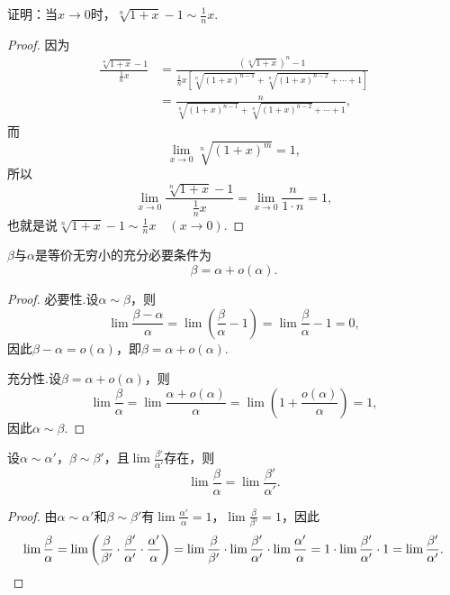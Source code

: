 \begin{example}
证明：当\(x\to0\)时，\(\sqrt[n]{1+x} - 1 \sim \frac{1}{n} x\).
\begin{proof}
因为\begin{align*}
\frac{\sqrt[n]{1+x} - 1}{\frac{1}{n} x}
&= \frac{(\sqrt[n]{1+x})^n - 1}{\frac{1}{n} x \left[ \sqrt[n]{(1+x)^{n-1}} + \sqrt[n]{(1+x)^{n-2}} + \dotsb + 1 \right]} \\
&= \frac{n}{\sqrt[n]{(1+x)^{n-1}} + \sqrt[n]{(1+x)^{n-2}} + \dotsb + 1},
\end{align*}
而\[
\lim\limits_{x\to0} \sqrt[n]{(1+x)^m} = 1,
\]所以\[
\lim\limits_{x\to0} \frac{\sqrt[n]{1+x} - 1}{\frac{1}{n} x} = \lim\limits_{x\to0} \frac{n}{1 \cdot n} = 1,
\]也就是说\(\sqrt[n]{1+x} - 1 \sim \frac{1}{n} x \quad(x\to0)\).
\end{proof}
\end{example}

\begin{theorem}\label{theorem:极限.无穷小的比较1}
\(\beta\)与\(\alpha\)是等价无穷小的充分必要条件为\[\beta=\alpha+o(\alpha).\]
\begin{proof}
必要性.设\(\alpha\sim\beta\)，则\[
\lim\frac{\beta-\alpha}{\alpha}
=\lim\left(\frac{\beta}{\alpha}-1\right)
=\lim\frac{\beta}{\alpha}-1 = 0,
\]因此\(\beta-\alpha=o(\alpha)\)，即\(\beta=\alpha+o(\alpha)\).

充分性.设\(\beta=\alpha+o(\alpha)\)，则\[
\lim\frac{\beta}{\alpha}
=\lim\frac{\alpha+o(\alpha)}{\alpha}
=\lim\left(1+\frac{o(\alpha)}{\alpha}\right) = 1,
\]因此\(\alpha\sim\beta\).
\end{proof}
\end{theorem}

\begin{theorem}\label{theorem:极限.无穷小的比较2}
设\(\alpha\sim\alpha'\)，\(\beta\sim\beta'\)，且\(\lim\frac{\beta'}{\alpha'}\)存在，则\[
\lim\frac{\beta}{\alpha}=\lim\frac{\beta'}{\alpha'}.
\]
\begin{proof}
由\(\alpha\sim\alpha'\)和\(\beta\sim\beta'\)有\(\lim\frac{\alpha'}{\alpha} = 1\)，\(\lim\frac{\beta}{\beta'} = 1\)，因此\[
\lim\frac{\beta}{\alpha}
= \lim \left( \frac{\beta}{\beta'} \cdot \frac{\beta'}{\alpha'} \cdot \frac{\alpha'}{\alpha} \right)
= \lim\frac{\beta}{\beta'} \cdot \lim \frac{\beta'}{\alpha'} \cdot \lim\frac{\alpha'}{\alpha}
= 1 \cdot \lim \frac{\beta'}{\alpha'} \cdot 1
= \lim \frac{\beta'}{\alpha'}.
\qedhere
\]
\end{proof}
\end{theorem}

